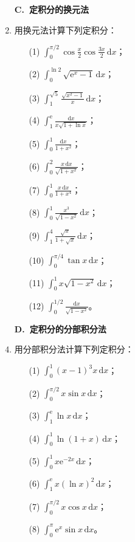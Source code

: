 \documentclass[fontset=fandol]{ctexart}
\newcommand{\dd}{\mathrm{d}}
\newcommand{\ee}{\mathrm{e}}
\begin{document}
\begin{enumerate}
\item[]\textbf{C.\ 定积分的换元法}
\setcounter{enumi}{0}
\item 用换元法计算下列定积分：
\begin{enumerate}
\item[(1)] $\displaystyle \int_0^{\pi/2}\cos\frac{x}{2}\cos\frac{3x}{2}\,\dd x$；
\item[(2)] $\displaystyle \int_0^{\ln2}\sqrt{\ee^x-1}\,\dd x$；
\item[(3)] $\displaystyle \int_1^{\sqrt5}\frac{\sqrt{x^2-1}}{x}\,\dd x$；
\item[(4)] $\displaystyle \int_1^\ee\frac{\dd x}{x\sqrt{1+\ln x}}$；
\item[(5)] $\displaystyle \int_0^1\frac{\dd x}{1+x^2}$；
\item[(6)] $\displaystyle \int_0^2\frac{x\,\dd x}{\sqrt{1+x^2}}$；
\item[(7)] $\displaystyle \int_0^1\frac{x\,\dd x}{1+x^4}$；
\item[(8)] $\displaystyle \int_0^1\frac{x^3}{\sqrt{1-x^2}}\,\dd x$；
\item[(9)] $\displaystyle \int_1^4\frac{\sqrt{x}}{1+\sqrt{x}}\,\dd x$；
\item[(10)] $\displaystyle \int_0^{\pi/4}\tan x\,\dd x$；
\item[(11)] $\displaystyle \int_0^1x\sqrt{1-x^2}\,\dd x$；
\item[(12)] $\displaystyle \int_0^{1/2}\frac{\dd x}{\sqrt{1-x^2}}$。
\end{enumerate}

\item[]\textbf{D.\ 定积分的分部积分法}
\setcounter{enumi}{0}
\item 用分部积分法计算下列定积分：
\begin{enumerate}
\item[(1)] $\displaystyle \int_0^1(x-1)^3x\,\dd x$；
\item[(2)] $\displaystyle \int_0^{\pi/2}x\sin x\,\dd x$；
\item[(3)] $\displaystyle \int_1^\ee\ln x\,\dd x$；
\item[(4)] $\displaystyle \int_0^1\ln(1+x)\,\dd x$；
\item[(5)] $\displaystyle \int_0^1x\ee^{-2x}\,\dd x$；
\item[(6)] $\displaystyle \int_1^\ee x(\ln x)^2\,\dd x$；
\item[(7)] $\displaystyle \int_0^{\pi/2}x\cos x\,\dd x$；
\item[(8)] $\displaystyle \int_0^\pi \ee^x\sin x\,\dd x$。
\end{enumerate}


\end{enumerate}
\end{document}
